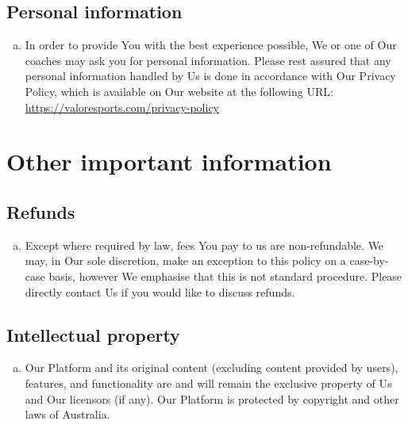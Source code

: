 \documentclass[10pt]{article}
\begin{document}
\subsection{Personal information}
\begin{enumerate}[(a)]
\item
In order to provide You with the best experience possible, We or one of Our coaches may ask you for personal information. Please rest assured that any personal information handled by Us is done in accordance with Our Privacy Policy, which is available on Our website at the following URL: \url{https://valoresports.com/privacy-policy}
\end{enumerate}

\section{Other important information}
\subsection{Refunds}
\begin{enumerate}[(a)]
\item
Except where required by law, fees You pay to us are non-refundable. We may, in Our sole discretion, make an exception to this policy on a case-by-case basis, however We emphasise that this is not standard procedure. Please directly contact Us if you would like to discuss refunds.
\end{enumerate}

\subsection{Intellectual property}
\begin{enumerate}[(a)]
\item
Our Platform and its original content (excluding content provided by users), features, and functionality are and will remain the exclusive property of Us and Our licensors (if any). Our Platform is protected by copyright and other laws of Australia.
\end{enumerate}
\end{document}
